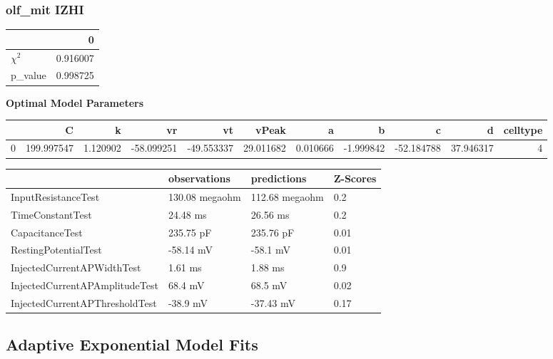 \subsubsection{olf_mit IZHI}\begin{tabular}{lr}
\toprule
{} &         0 \\
\midrule
$\chi^{2}$ &  0.916007 \\
p\_value    &  0.998725 \\
\bottomrule
\end{tabular}
\textbf{Optimal Model Parameters} \begin{tabular}{lrrrrrrrrrr}
\toprule
{} &           C &         k &         vr &         vt &      vPeak &         a &         b &          c &          d &  celltype \\
\midrule
0 &  199.997547 &  1.120902 & -58.099251 & -49.553337 &  29.011682 &  0.010666 & -1.999842 & -52.184788 &  37.946317 &         4 \\
\bottomrule
\end{tabular}
\begin{tabular}{llll}
\toprule
{} &    observations &     predictions & Z-Scores \\
\midrule
InputResistanceTest            &  130.08 megaohm &  112.68 megaohm &      0.2 \\
TimeConstantTest               &        24.48 ms &        26.56 ms &      0.2 \\
CapacitanceTest                &       235.75 pF &       235.76 pF &     0.01 \\
RestingPotentialTest           &       -58.14 mV &        -58.1 mV &     0.01 \\
InjectedCurrentAPWidthTest     &         1.61 ms &         1.88 ms &      0.9 \\
InjectedCurrentAPAmplitudeTest &         68.4 mV &         68.5 mV &     0.02 \\
InjectedCurrentAPThresholdTest &        -38.9 mV &       -37.43 mV &     0.17 \\
\bottomrule
\end{tabular}


\subsection{Adaptive Exponential Model Fits}

